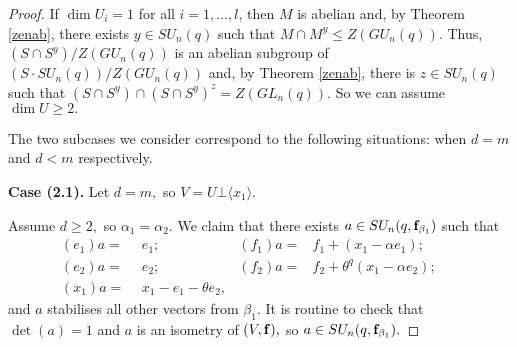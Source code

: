 \begin{proof}
If  $\dim U_i=1$ for all $i=1, \ldots, l$, then $M$ is abelian and, by Theorem \ref{zenab}, there exists $y \in SU_n(q)$ such that $M \cap M^y \le Z(GU_n(q)).$ Thus, $(S \cap S^y)/Z(GU_n(q))$ is an abelian subgroup of $(S \cdot SU_n(q))/Z(GU_n(q))$ and, by Theorem \ref{zenab}, there is $z \in SU_n(q)$ such that $(S \cap S^y) \cap (S \cap S^y)^z =Z(GL_n(q))$. So we can assume $\dim U \ge 2.$




\medskip


The two subcases we consider correspond to the following situations:
when $d=m$ and  $d<m$ respectively.

\medskip

{\bf Case (2.1).} Let $d=m,$ so $V=U \bot \langle x_1 \rangle.$

Assume $d\ge 2,$ so $\alpha_1=\alpha_2.$ 
We claim that there exists  $a \in SU_n(q, {\bf f}_{\beta_1})$ such that 
\begin{align*}
(e_1)a= &\phantom{(}  e_1; & (f_1)a= & f_1 +(x_1 - \alpha e_1); & \\
(e_{2})a=  & \phantom{(}  e_{2}; & (f_{2})a= & f_{2}+\theta^q(x_1 - \alpha e_2); & \\
(x_1)a= & \phantom{(} x_1 -e_1 -\theta e_2, &  & & & 
\end{align*}
and $a$ stabilises all other vectors from $\beta_1.$   It is routine to check that $\det(a)=1$ and $a$ is an isometry of $(V, {\bf f}),$ so $a \in SU_n(q,{\bf f}_{\beta_1}).$


\end{proof}
